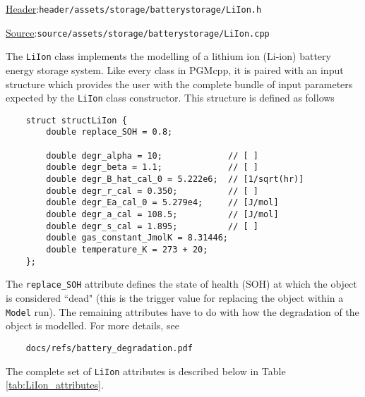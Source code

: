 \documentclass[12pt, letterpaper]{report}
\begin{document}
\begin{large}
\noindent\underline{Header}:\quad\texttt{header/assets/storage/batterystorage/LiIon.h}\par
\noindent\underline{Source}:\quad\texttt{source/assets/storage/batterystorage/LiIon.cpp}\par
\end{large}
\vspace{5mm}

The \texttt{LiIon} class implements the modelling of a lithium ion (Li-ion) battery energy storage system. Like every class in PGMcpp, it is paired with an input structure which provides the user with the complete bundle of input parameters expected by the \texttt{LiIon} class constructor. This structure is defined as follows

\begin{verbatim}
    struct structLiIon {
        double replace_SOH = 0.8;
        
        double degr_alpha = 10;             // [ ]
        double degr_beta = 1.1;             // [ ]
        double degr_B_hat_cal_0 = 5.222e6;  // [1/sqrt(hr)]
        double degr_r_cal = 0.350;          // [ ]
        double degr_Ea_cal_0 = 5.279e4;     // [J/mol]
        double degr_a_cal = 108.5;          // [J/mol]
        double degr_s_cal = 1.895;          // [ ]
        double gas_constant_JmolK = 8.31446;
        double temperature_K = 273 + 20;    
    };
\end{verbatim}

\noindent The \texttt{replace\_SOH} attribute defines the state of health (SOH) at which the object is considered ``dead" (this is the trigger value for replacing the object within a \texttt{Model} run). The remaining attributes have to do with how the degradation of the object is modelled. For more details, see

\begin{verbatim}
    docs/refs/battery_degradation.pdf
\end{verbatim}

The complete set of \texttt{LiIon} attributes is described below in Table \ref{tab:LiIon_attributes}.
\end{document}
